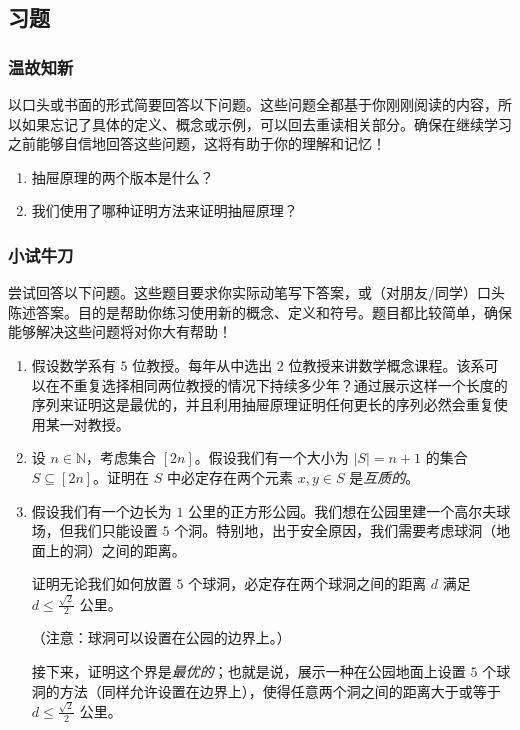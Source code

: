 
\subsection{习题}

\subsubsection*{温故知新}

以口头或书面的形式简要回答以下问题。这些问题全都基于你刚刚阅读的内容，所以如果忘记了具体的定义、概念或示例，可以回去重读相关部分。确保在继续学习之前能够自信地回答这些问题，这将有助于你的理解和记忆！

\begin{enumerate}[label=(\arabic*)]
    \item 抽屉原理的两个版本是什么？
    \item 我们使用了哪种证明方法来证明抽屉原理？
\end{enumerate}

\subsubsection*{小试牛刀}

尝试回答以下问题。这些题目要求你实际动笔写下答案，或（对朋友/同学）口头陈述答案。目的是帮助你练习使用新的概念、定义和符号。题目都比较简单，确保能够解决这些问题将对你大有帮助！

\begin{enumerate}[label=(\arabic*)]
    \item 假设数学系有 $5$ 位教授。每年从中选出 $2$ 位教授来讲数学概念课程。该系可以在不重复选择相同两位教授的情况下持续多少年？通过展示这样一个长度的序列来证明这是最优的，并且利用抽屉原理证明任何更长的序列必然会重复使用某一对教授。
    \item 设 $n \in \mathbb{N}$，考虑集合 $[2n]$。假设我们有一个大小为 $|S|=n+1$ 的集合 $S \subseteq [2n]$。证明在 $S$ 中必定存在两个元素 $x,y \in S$ 是\emph{互质的}。
    \item 假设我们有一个边长为 $1$ 公里的正方形公园。我们想在公园里建一个高尔夫球场，但我们只能设置 $5$ 个洞。特别地，出于安全原因，我们需要考虑球洞（地面上的洞）之间的距离。
    
    证明无论我们如何放置 $5$ 个球洞，必定存在两个球洞之间的距离 $d$ 满足 $d \le \frac{\sqrt{2}}{2}$ 公里。

    （注意：球洞可以设置在公园的边界上。）
    
    接下来，证明这个界是\emph{最优的}；也就是说，展示一种在公园地面上设置 $5$ 个球洞的方法（同样允许设置在边界上），使得任意两个洞之间的距离大于或等于 $d \le \frac{\sqrt{2}}{2}$ 公里。
\end{enumerate}